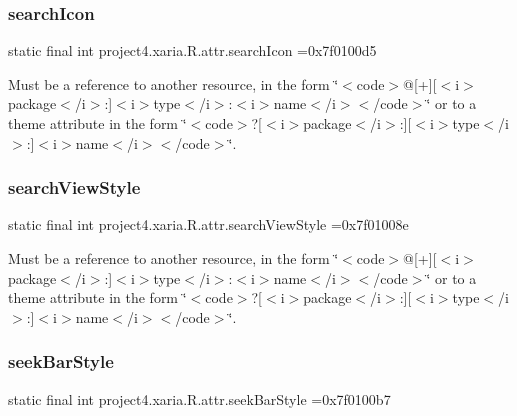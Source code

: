 \subsubsection{\texorpdfstring{search\+Icon}{searchIcon}}
{\footnotesize\ttfamily static final int project4.\+xaria.\+R.\+attr.\+search\+Icon =0x7f0100d5\hspace{0.3cm}{\ttfamily [static]}}

Must be a reference to another resource, in the form \char`\"{}$<$code$>$@\mbox{[}+\mbox{]}\mbox{[}$<$i$>$package$<$/i$>$\+:\mbox{]}$<$i$>$type$<$/i$>$\+:$<$i$>$name$<$/i$>$$<$/code$>$\char`\"{} or to a theme attribute in the form \char`\"{}$<$code$>$?\mbox{[}$<$i$>$package$<$/i$>$\+:\mbox{]}\mbox{[}$<$i$>$type$<$/i$>$\+:\mbox{]}$<$i$>$name$<$/i$>$$<$/code$>$\char`\"{}. \mbox{\label{classproject4_1_1xaria_1_1R_1_1attr_a1426985217d53e8b5462a33852726bcf}} 
\subsubsection{\texorpdfstring{search\+View\+Style}{searchViewStyle}}
{\footnotesize\ttfamily static final int project4.\+xaria.\+R.\+attr.\+search\+View\+Style =0x7f01008e\hspace{0.3cm}{\ttfamily [static]}}

Must be a reference to another resource, in the form \char`\"{}$<$code$>$@\mbox{[}+\mbox{]}\mbox{[}$<$i$>$package$<$/i$>$\+:\mbox{]}$<$i$>$type$<$/i$>$\+:$<$i$>$name$<$/i$>$$<$/code$>$\char`\"{} or to a theme attribute in the form \char`\"{}$<$code$>$?\mbox{[}$<$i$>$package$<$/i$>$\+:\mbox{]}\mbox{[}$<$i$>$type$<$/i$>$\+:\mbox{]}$<$i$>$name$<$/i$>$$<$/code$>$\char`\"{}. \mbox{\label{classproject4_1_1xaria_1_1R_1_1attr_a3a7de88c3a4a5f59c01478d794063961}} 
\subsubsection{\texorpdfstring{seek\+Bar\+Style}{seekBarStyle}}
{\footnotesize\ttfamily static final int project4.\+xaria.\+R.\+attr.\+seek\+Bar\+Style =0x7f0100b7\hspace{0.3cm}{\ttfamily [static]}}

